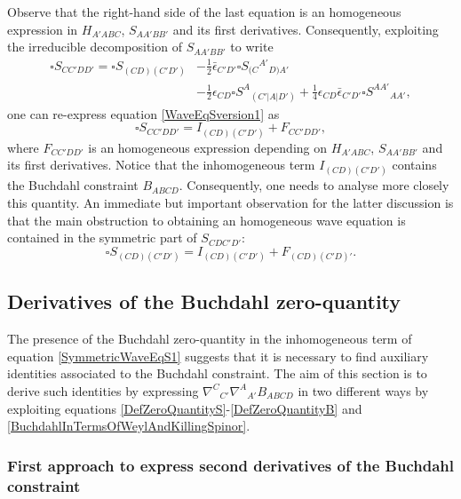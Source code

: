 \documentclass[10pt,a4paper]{article}
\theoremstyle{plain}
\begin{document}
Observe that the right-hand side of the last equation is an
homogeneous expression in $H_{A'ABC}$, $S_{AA'BB'}$ and its first
derivatives. Consequently, exploiting the irreducible decomposition of
$S_{AA'BB'}$ to write
\begin{align}\label{decompositionWaveEqS}
\square S_{CC'DD'} = \square S_{(CD)(C'D')} &- \tfrac{1}{2}
\bar{\epsilon}_{C'D'}\square S_{(C}{}^{A'}{}_{D)A'} \nonumber\\ &-
\tfrac{1}{2} \epsilon_{CD} \square S^{A}{}_{(C'|A|D')}+ \tfrac{1}{4}
\epsilon_{CD} \bar{\epsilon}_{C'D'}\square S^{AA'}{}_{AA'},
\end{align}
 one can re-express equation \eqref{WaveEqSversion1} as
\begin{equation}\label{WaveEqSFirstSplit}
\square S_{CC'DD'}=I_{(CD)(C'D')} + F_{CC'DD'},
\end{equation}
where $ F_{CC'DD'}$ is an homogeneous expression depending on
$H_{A'ABC}$, $S_{AA'BB'}$ and its first derivatives.  Notice that the
inhomogeneous term $I_{(CD)(C'D')} $ contains the Buchdahl constraint
$B_{ABCD}$. Consequently, one needs to analyse more closely this
quantity.  An immediate but important observation for the latter
discussion is that the main obstruction to obtaining an homogeneous wave
equation is contained in the symmetric part of $S_{CDC'D'}$:
\begin{equation}\label{SymmetricWaveEqS1}
\square S_{(CD)(C'D')}=I_{(CD)(C'D')} + F_{(CD)(C'D)'}.
\end{equation}

\subsection{Derivatives of the Buchdahl zero-quantity}
\label{DerivativesOfTheBuchdahlZeroQuantity}

The presence of the Buchdahl zero-quantity in the
 inhomogeneous term of equation \eqref{SymmetricWaveEqS1} suggests
that it is necessary to find auxiliary identities associated to the
Buchdahl constraint. The aim of this section is to derive such
identities by expressing $\nabla^{C}{}_{C'}\nabla^{A}{}_{A'}B_{ABCD}$
in two different ways by exploiting equations
\eqref{DefZeroQuantityS}-\eqref{DefZeroQuantityB} and
\eqref{BuchdahlInTermsOfWeylAndKillingSpinor}.

\subsubsection{First approach to express second derivatives of the Buchdahl constraint}
\end{document}
